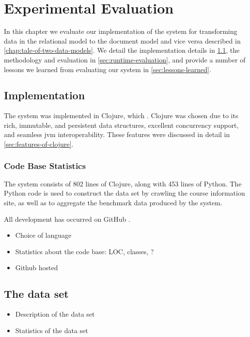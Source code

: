 \chapter{Experimental Evaluation}
\label{chap:experimental-evaluation}
	In this chapter we evaluate our implementation of the system for transforming data in the relational model to the document model and vice versa described in \cref{chap:tale-of-two-data-models}.  We detail the implementation details in \cref{sec:implementation}, the methodology and evaluation in \cref{sec:runtime-evaluation}, and provide a number of lessons we learned from evaluating our system in \cref{sec:lessons-learned}.
	
	\section{Implementation}
	\label{sec:implementation}
		The system was implemented in Clojure, which .  Clojure was chosen due to its rich, immutable, and persistent data structures, excellent concurrency support, and seamless \gls{jvm} interoperability.  These features were discussed in detail in \cref{sec:features-of-clojure}.
		
		\subsection{Code Base Statistics}
			The system consists of 802 lines of Clojure, along with 453 lines of Python.  The Python code is used to construct the data set by crawling the course information site, as well as to aggregate the benchmark data produced by the system.
			
			All development has occurred on GitHub \cite{molly-repo}.
			
		\begin{itemize}
			\item Choice of language
			\item Statistics about the code base: LOC, classes, ?
			\item Github hosted
		\end{itemize}
	
	\section{The data set}
		\begin{itemize}
			\item Description of the data set
			\item Statistics of the data set
		\end{itemize}
	
